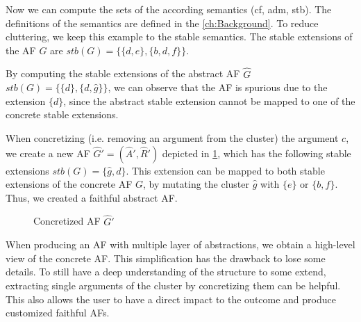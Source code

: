 Now we can compute the sets of the according semantics (cf, adm, stb). The definitions of the semantics are defined in the \cref{ch:Background}. To reduce cluttering, we keep this example to the stable semantics. The stable extensions of the AF $G$ are $stb(G) = \bigl\{\{d, e\}, \{b, d, f\}\bigl\}$.

By computing the stable extensions of the abstract AF $\hat{G}$ $stb(G) = \bigl\{\{d\}, \{d, \hat{g}\}\bigl\}$, we can observe that the AF is spurious due to the extension $\{d\}$, since the abstract stable extension cannot be mapped to one of the concrete stable extensions.

When concretizing (i.e. removing an argument from the cluster) the argument $c$, we create a new AF $\hat{G}' = (\hat{A}', \hat{R}')$ depicted in \cref{af:introExample3}, which has the following stable extensions $stb(G) = \{\hat{g}, d\}$. This extension can be mapped to both stable extensions of the concrete AF $G$, by mutating the cluster $\hat{g}$ with $\{e\}$ or $\{b, f\}$. Thus, we created a faithful abstract AF.

\begin{figure}[h]
    \centering
    \caption{Concretized AF $\hat{G}'$}
    \label{af:introExample3}
\end{figure}


When producing an AF with multiple layer of abstractions, we obtain a high-level view of the concrete AF. This simplification has the drawback to lose some details. To still have a deep understanding of the structure to some extend, extracting single arguments of the cluster by concretizing them can be helpful. This also allows the user to have a direct impact to the outcome and produce customized faithful AFs.


